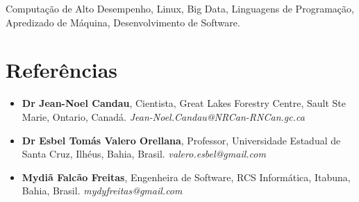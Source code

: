 \documentclass[a4paper, oneside, final]{scrartcl} %
\begin{document}
\begin{center}
\begin{flushleft}
Computação de Alto Desempenho, Linux, Big Data, Linguagens de Programação, Apredizado de Máquina, Desenvolvimento de Software.
\end{flushleft}


\section{Referências}

\begin{itemize} \itemsep4pt \parskip0pt 
\item \textbf{Dr Jean-Noel Candau}, Cientista, Great Lakes Forestry Centre, Sault Ste Marie, Ontario, Canadá. \textit{Jean-Noel.Candau@NRCan-RNCan.gc.ca}
\item \textbf{Dr Esbel Tomás Valero Orellana}, Professor, Universidade Estadual de Santa Cruz, Ilhéus, Bahia, Brasil. \textit{valero.esbel@gmail.com} 
\item \textbf{Mydiã Falcão Freitas}, Engenheira de Software, RCS Informática, Itabuna, Bahia, Brasil. \textit{mydyfreitas@gmail.com} 
\end{itemize}

\end{center}
\end{document}
